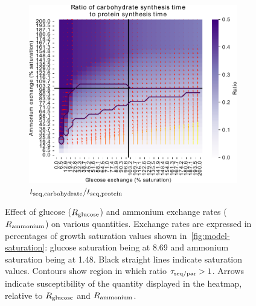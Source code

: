 \begin{figure}
  \begin{subfigure}[t]{0.45\textwidth}
  \centering
    \includegraphics[width=\linewidth]{ec_grid_glc_amm_carb_to_prot}
    \caption{
      $t_{\mathrm{seq},\mathrm{carbohydrate}}/t_{\mathrm{seq},\mathrm{protein}}$
    }
    \label{fig:model-grid-glc-carb-to-prot}
  \end{subfigure}
  \caption{
    Effect of glucose ($R_{\mathrm{glucose}}$) and ammonium exchange rates ($R_{\mathrm{ammonium}}$) on various quantities.
    Exchange rates are expressed in percentages of growth saturation values shown in~\ref{fig:model-saturation}: glucose saturation being at \SI{8.69}{\mmolgdwh} and ammonium saturation being at \SI{1.48}{\mmolgdwh}.
    Black straight lines indicate saturation values.
    Contours show region in which ratio $\tau_{\mathrm{seq}/\mathrm{par}} > 1$.
    Arrows indicate susceptibility of the quantity displayed in the heatmap, relative to $R_{\mathrm{glucose}}$ and $R_{\mathrm{ammonium}}$.
  }
  \label{fig:model-grid-glc}
\end{figure}

